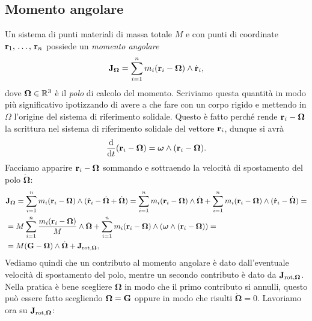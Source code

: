     \subsection{Momento angolare}
    Un sistema di punti materiali di massa totale $M$ e con punti di coordinate $\mathbf{r}_1,\,\dots,\,\mathbf{r}_n$ possiede un \emph{momento angolare}
    \begin{equation}
        \mathbf{J}_{\boldsymbol{\Omega}} = \sum_{i=1}^n m_i(\mathbf{r}_i-\boldsymbol{\Omega}) \wedge \dot{\mathbf{r}}_i,
    \end{equation}
    dove $\boldsymbol{\Omega}\in \mathbb{R}^3$ è il \emph{polo} di calcolo del momento. Scriviamo questa quantità in modo più significativo ipotizzando di avere a che fare con un corpo rigido e mettendo in $\Omega$ l'origine del sistema di riferimento solidale. Questo è fatto perché rende $\mathbf{r}_i-\boldsymbol{\Omega}$ la scrittura nel sistema di riferimento solidale del vettore $\mathbf{r}_i$, dunque si avrà
    \begin{equation}
        \frac{\mathrm{d}}{\mathrm{d}t} (\mathbf{r}_i-\boldsymbol{\Omega}) = \boldsymbol{\omega}\wedge(\mathbf{r}_i-\boldsymbol{\Omega}).
    \end{equation}
    Facciamo apparire $\mathbf{r}_i-\boldsymbol{\Omega}$ sommando e sottraendo la velocità di spostamento del polo $\dot{\boldsymbol{\Omega}}:$
    \begin{equation}
    \begin{aligned}
        &\mathbf{J}_{\boldsymbol{\Omega}} = \sum_{i=1}^nm_i(\mathbf{r}_i-\boldsymbol{\Omega}) \wedge (\dot{\mathbf{r}}_i-\dot{\boldsymbol{\Omega}}+\dot{\boldsymbol{\Omega}}) = \sum_{i=1}^nm_i(\mathbf{r}_i-\boldsymbol{\Omega})\wedge \dot{\boldsymbol{\Omega}}+ \sum_{i=1}^nm_i(\mathbf{r}_i-\boldsymbol{\Omega})\wedge (\dot{\mathbf{r}}_i-\dot{\boldsymbol{\Omega}})=\\
        &= M\sum_{i=1}^n\frac{m_i(\mathbf{r}_i-\boldsymbol{\Omega})}{M}\wedge \dot{\boldsymbol{\Omega}}+ \sum_{i=1}^nm_i(\mathbf{r}_i-\boldsymbol{\Omega})\wedge (\boldsymbol{\omega} \wedge (\mathbf{r}_i-\boldsymbol{\Omega}))=\\
        &=M(\mathbf{G}-\boldsymbol{\Omega})\wedge\dot{\boldsymbol{\Omega}}+\mathbf{J}_{\mathrm{rot}, \boldsymbol{\Omega}},
        \end{aligned}
    \end{equation}
    Vediamo quindi che un contributo al momento angolare è dato dall'eventuale velocità di spostamento del polo, mentre un secondo contributo è dato da $\mathbf{J}_{\mathrm{rot}, \boldsymbol{\Omega}}$. Nella pratica è bene scegliere $\boldsymbol{\Omega}$ in modo che il primo contributo si annulli, questo può essere fatto scegliendo $\boldsymbol{\Omega}=\mathbf{G}$ oppure in modo che risulti $\dot{\boldsymbol{\Omega}}=0.$ Lavoriamo ora su $\mathbf{J}_{\mathrm{rot},\boldsymbol{\Omega}}$:
